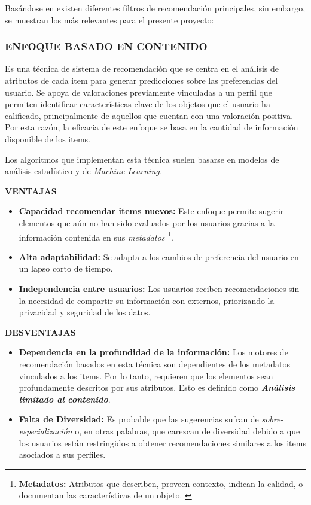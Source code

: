 Basándose en \parencite{ISINKAYE2015261} existen diferentes filtros de recomendación principales, sin embargo, se muestran los más relevantes para el presente proyecto:

\subsubsection[BASADO EN CONTENIDO]{ENFOQUE BASADO EN CONTENIDO }
Es una técnica de sistema de recomendación que se centra en el análisis de atributos de cada item para generar predicciones sobre las preferencias del usuario. Se apoya de valoraciones previamente vinculadas a un perfil que permiten identificar características clave de los objetos que el usuario ha calificado, principalmente de aquellos que cuentan con una valoración positiva.  Por esta razón, la eficacia de este enfoque se basa en la cantidad de información disponible de los items.

Los algoritmos que implementan esta técnica suelen basarse en modelos de análisis estadístico y de \textit{Machine Learning.}

\newpage

\textbf{VENTAJAS }
\begin{itemize}

    \item \textbf{Capacidad recomendar items nuevos: } Este enfoque permite sugerir elementos que aún no han sido evaluados por los usuarios gracias a la información contenida en sus \textit{metadatos} \footnote{\textbf{Metadatos: } Atributos que describen, proveen contexto, indican la calidad, o documentan las características de un objeto. \parencite{Greenberg09092005}}.
    \item \textbf{Alta adaptabilidad: } Se adapta a los cambios de preferencia del usuario en un lapso corto de tiempo.

    \item \textbf{Independencia entre usuarios: } Los usuarios reciben recomendaciones sin la necesidad de compartir su información con externos, priorizando la privacidad y seguridad de los datos.
    
\end{itemize}

\textbf{DESVENTAJAS }
\begin{itemize}

    \item \textbf{Dependencia en la profundidad de la información: } Los motores de recomendación basados en esta técnica son dependientes de los metadatos vinculados a los items. Por lo tanto, requieren que los elementos sean profundamente descritos por sus atributos. Esto es definido como \textbf{\textit{Análisis limitado al contenido}}.
    
    \item \textbf{Falta de Diversidad: } Es probable que las sugerencias sufran de \textit{sobre-especialización} o, en otras palabras, que carezcan de diversidad debido a que los usuarios están restringidos a obtener recomendaciones similares a los items asociados a sus perfiles.
\end{itemize}

